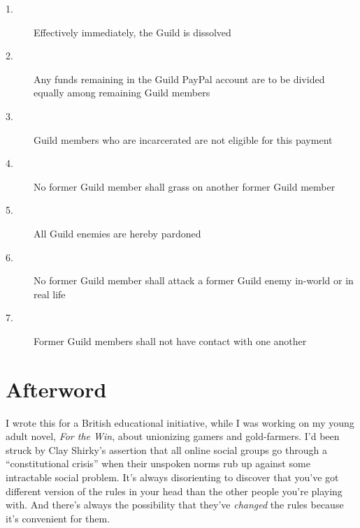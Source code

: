 \begin{description}
\item[1.] Effectively immediately, the Guild is dissolved

\item[2.] Any funds remaining in the Guild PayPal account are to be divided 
equally among remaining Guild members

\item[3.] Guild members who are incarcerated are not eligible for this payment

\item[4.] No former Guild member shall grass on another former Guild member

\item[5.] All Guild enemies are hereby pardoned

\item[6.] No former Guild member shall attack a former Guild enemy in-world or 
in real life

\item[7.] Former Guild members shall not have contact with one another
\end{description}

\section{Afterword}

I wrote this for a British educational initiative, while I was working 
on my young adult novel, \emph{For the Win}, about unionizing gamers 
and gold-farmers. I'd been struck by Clay Shirky's assertion that all 
online social groups go through a “constitutional crisis” when 
their unspoken norms rub up against some intractable social problem. 
It's always disorienting to discover that you've got different version 
of the rules in your head than the other people you're playing with. 
And there's always the possibility that they've \emph{changed} the 
rules because it's convenient for them.


